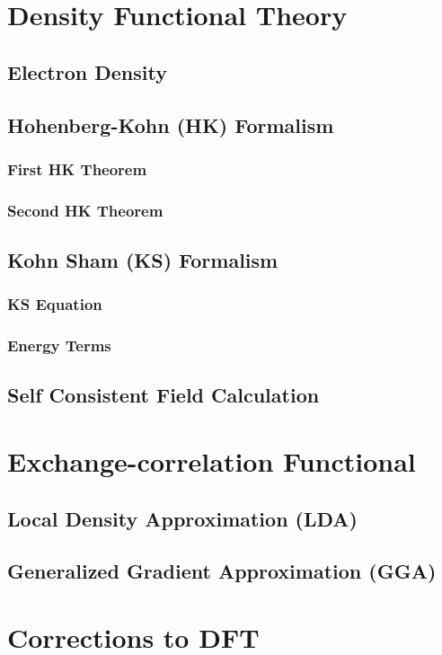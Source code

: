 \section{Density Functional Theory}
    \subsection{Electron Density}
    \subsection{Hohenberg-Kohn (HK) Formalism}
    \subsubsection{First HK Theorem}
        \subsubsection{Second HK Theorem}
    \subsection{Kohn Sham (KS) Formalism}
        \subsubsection{KS Equation}
        \subsubsection{Energy Terms}
    \subsection{Self Consistent Field Calculation}
\section{Exchange-correlation Functional}
    \subsection{Local Density Approximation (LDA)}
    \subsection{Generalized Gradient Approximation (GGA)}

\section{Corrections to DFT}
